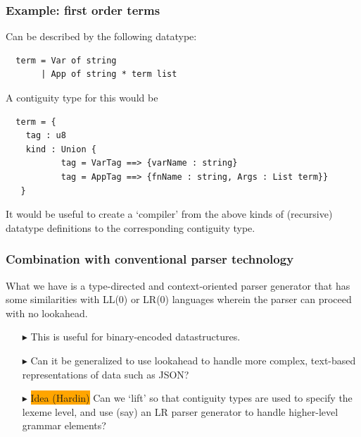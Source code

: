 \documentclass{beamer}
\newcommand{\kemph}[1]{\colorbox{orange}{#1}}
\begin{document}
\begin{frame}[fragile]\frametitle{Example: first order terms}

Can be described by the following datatype:

{\small
\begin{verbatim}
  term = Var of string
       | App of string * term list
\end{verbatim}}

A contiguity type for this would be

{\small
\begin{verbatim}
  term = {
    tag : u8
    kind : Union {
           tag = VarTag ==> {varName : string}
           tag = AppTag ==> {fnName : string, Args : List term}}
   }
\end{verbatim}}

It would be useful to create a `compiler' from the above kinds of
(recursive) datatype definitions to the corresponding contiguity type.

\end{frame}

\begin{frame}\frametitle{Combination with conventional parser technology}

  What we have is a type-directed and context-oriented parser
  generator that has some similarities with LL(0) or LR(0) languages
  wherein the parser can proceed with no lookahead.

\begin{itemize}

\item  [$\blacktriangleright$] This is useful for binary-encoded datastructures.

\item [$\blacktriangleright$] Can it be generalized to use lookahead
  to handle more complex, text-based representations of data such as
  JSON?

\item [$\blacktriangleright$]
\kemph{Idea (Hardin)} Can we `lift' so that contiguity types are
  used to specify the lexeme level, and use (say) an LR parser
  generator to handle higher-level grammar elements?
\end{itemize}

\end{frame}
\end{document}
